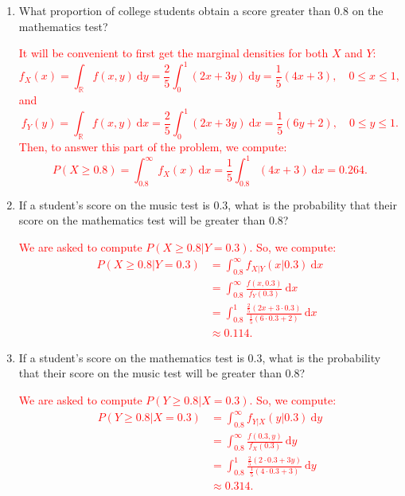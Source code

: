 \documentclass[12pt,reqno]{amsart}
\begin{document}
\medskip
\begin{enumerate}
\item What proportion of college students obtain a score greater than 0.8 on the mathematics test?

\bigskip
\textcolor{red}{It will be convenient to first get the marginal densities for both $X$ and $Y$:
	\[
	f_X(x) = \int_{\mathbb{R}} f(x,y) \ \text{d} y = \frac{2}{5} \int_0^1 (2x+3y) \ \text{d} y = \frac{1}{5}(4x+3), \quad 0 \leq x \leq 1,
	\]
and
	\[
	f_Y(y) = \int_{\mathbb{R}} f(x,y) \ \text{d} x = \frac{2}{5} \int_0^1 (2x+3y) \ \text{d} x = \frac{1}{5}(6y+2), \quad 0 \leq y \leq1.
	\]
Then, to answer this part of the problem, we compute:
	\[
	P(X\geq 0.8) = \int_{0.8}^\infty f_X(x) \ \text{d} x = \frac{1}{5} \int_{0.8}^1 (4x+3) \ \text{d} x = 0.264.
	\]}
\bigskip

\item If a student’s score on the music test is 0.3, what is the probability that their score on the mathematics test will be greater than 0.8?

\bigskip
\textcolor{red}{We are asked to compute $P(X\geq 0.8 | Y=0.3)$. So, we compute:
	\begin{align*}
	P(X\geq 0.8 | Y=0.3) &= \int_{0.8}^\infty f_{X|Y}(x|0.3) \ \text{d} x \\
	&= \int_{0.8}^\infty \frac{f(x,0.3)}{f_Y(0.3)} \ \text{d} x \\
	&= \int_{0.8}^1 \frac{ \frac{2}{5}(2x+3\cdot 0.3)}{\frac{1}{5}(6\cdot 0.3 + 2)} \ \text{d} x \\
	&\approx 0.114. 
	\end{align*}}
\bigskip

\item If a student’s score on the mathematics test is 0.3, what is the probability that their score on the music test will be greater than 0.8?

\bigskip
\textcolor{red}{We are asked to compute $P(Y\geq 0.8 | X=0.3)$. So, we compute:
	\begin{align*}
	P(Y\geq 0.8 | X=0.3) &= \int_{0.8}^\infty f_{Y|X}(y|0.3) \ \text{d} y \\
	&= \int_{0.8}^\infty \frac{f(0.3,y)}{f_X(0.3)} \ \text{d} y \\
	&= \int_{0.8}^1 \frac{ \frac{2}{5}(2\cdot 0.3+3y)}{\frac{1}{5}(4\cdot 0.3 + 3)} \ \text{d} y \\
	&\approx 0.314. 
	\end{align*}}
\bigskip
\end{enumerate}
\end{document}
